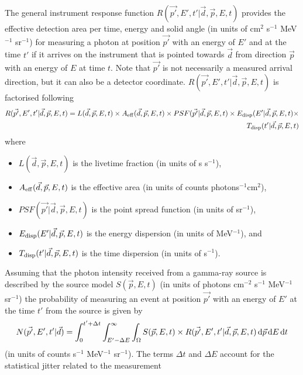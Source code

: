 \documentclass{article}[12pt,a4]
\begin{document}
The general instrument response function
$R(\vec{p'}, E', t' | \vec{d}, \vec{p}, E, t)$
provides the effective detection area per time, energy and solid angle
(in units of cm$^2$ s$^{-1}$ MeV$^{-1}$ sr$^{-1}$) 
for measuring a photon at position $\vec{p'}$ with an energy of $E'$ and at the time $t'$ if it 
arrives on the instrument that is pointed towards $\vec{d}$ from direction $\vec{p}$ with an 
energy of $E$ at time $t$.
Note that $\vec{p'}$ is not necessarily a measured arrival direction, but it can also be
a detector coordinate.
$R(\vec{p'}, E', t' | \vec{d}, \vec{p}, E, t)$ is factorised following
\begin{eqnarray}
R(\vec{p'}, E', t' | \vec{d}, \vec{p}, E, t) = 
L(\vec{d}, \vec{p}, E, t) \times
A_{\rm eff}(\vec{d}, \vec{p}, E, t) \times
PSF(\vec{p'} | \vec{d}, \vec{p}, E, t) \times
E_{\rm disp}(E' | \vec{d}, \vec{p}, E, t) \times \nonumber \\
T_{\rm disp}(t' | \vec{d}, \vec{p}, E, t)
\label{eq:rspfact}
\end{eqnarray}
where
\begin{itemize}
\item[] $L(\vec{d}, \vec{p}, E, t)$ is the livetime fraction (in units of s s$^{-1}$),
\item[] $A_{\rm eff}(\vec{d}, \vec{p}, E, t)$ is the effective area (in units of counts photons$^{-1}$cm$^2$),
\item[] $PSF(\vec{p'} | \vec{d}, \vec{p}, E, t)$ is the point spread function (in units of sr$^{-1}$),
\item[] $E_{\rm disp}(E' | \vec{d}, \vec{p}, E, t)$ is the energy dispersion (in units of MeV$^{-1}$), and
\item[] $T_{\rm disp}(t' | \vec{d}, \vec{p}, E, t)$ is the time dispersion (in units of s$^{-1}$).
\end{itemize}
Assuming that the photon intensity received from a gamma-ray source is described by
the source model $S(\vec{p}, E, t)$ (in units of photons cm$^{-2}$ s$^{-1}$ MeV$^{-1}$ sr$^{-1}$)
the probability of measuring an event at position $\vec{p'}$ with an
energy of $E'$ at the time $t'$ from the source is given by
\begin{equation}
N(\vec{p'}, E', t'| \vec{d}) = \int_{0}^{t'+\Delta t} \int_{E'-\Delta E}^{\infty} \int_{\Omega} 
S(\vec{p}, E, t) \times R(\vec{p'}, E', t' | \vec{d}, \vec{p}, E, t) \, {\rm d}\vec{p} \, {\rm d}E \,{\rm d}t
\label{eq:model}
\end{equation}
(in units of counts s$^{-1}$ MeV$^{-1}$ sr$^{-1}$).
The terms $\Delta t$ and $\Delta E$ account for the statistical jitter related to the measurement
\end{document}

